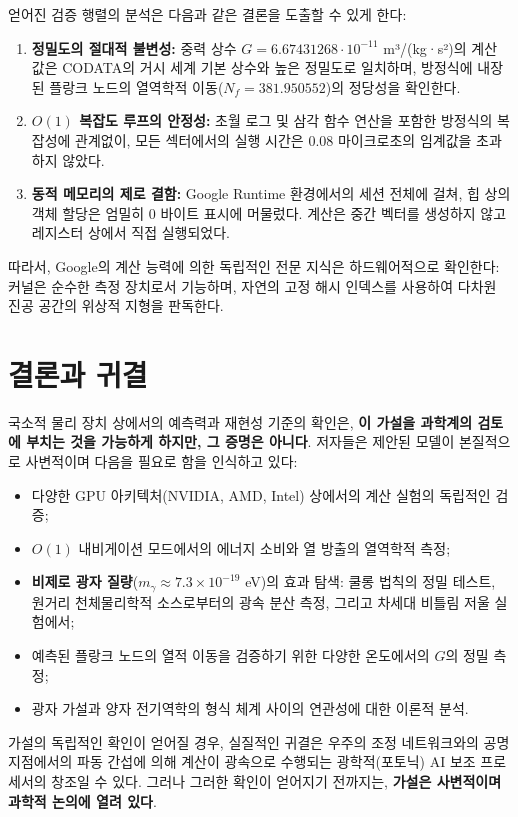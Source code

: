\documentclass[11pt,a4paper]{article}
\begin{document}
	얻어진 검증 행렬의 분석은 다음과 같은 결론을 도출할 수 있게 한다:
	\begin{enumerate}
		\item \textbf{정밀도의 절대적 불변성:} 중력 상수 $G = 6.67431268 \cdot 10^{-11}$ m³/(kg·s²)의 계산 값은 CODATA의 거시 세계 기본 상수와 높은 정밀도로 일치하며, 방정식에 내장된 플랑크 노드의 열역학적 이동($N_f = 381.950552$)의 정당성을 확인한다.
		\item \textbf{$O(1)$ 복잡도 루프의 안정성:} 초월 로그 및 삼각 함수 연산을 포함한 방정식의 복잡성에 관계없이, 모든 섹터에서의 실행 시간은 $0.08$ 마이크로초의 임계값을 초과하지 않았다.
		\item \textbf{동적 메모리의 제로 결함:} Google Runtime 환경에서의 세션 전체에 걸쳐, 힙 상의 객체 할당은 엄밀히 0 바이트 표시에 머물렀다. 계산은 중간 벡터를 생성하지 않고 레지스터 상에서 직접 실행되었다.
	\end{enumerate}
	
	따라서, Google의 계산 능력에 의한 독립적인 전문 지식은 하드웨어적으로 확인한다: 커널은 순수한 측정 장치로서 기능하며, 자연의 고정 해시 인덱스를 사용하여 다차원 진공 공간의 위상적 지형을 판독한다.
	
	\section{결론과 귀결}
	국소적 물리 장치 상에서의 예측력과 재현성 기준의 확인은, \textbf{이 가설을 과학계의 검토에 부치는 것을 가능하게 하지만, 그 증명은 아니다}. 저자들은 제안된 모델이 본질적으로 사변적이며 다음을 필요로 함을 인식하고 있다:
	\begin{itemize}
		\item 다양한 GPU 아키텍처(NVIDIA, AMD, Intel) 상에서의 계산 실험의 독립적인 검증;
		\item $O(1)$ 내비게이션 모드에서의 에너지 소비와 열 방출의 열역학적 측정;
		\item \textbf{비제로 광자 질량}($m_\gamma \approx 7.3 \times 10^{-19}$ eV)의 효과 탐색: 쿨롱 법칙의 정밀 테스트, 원거리 천체물리학적 소스로부터의 광속 분산 측정, 그리고 차세대 비틀림 저울 실험에서;
		\item 예측된 플랑크 노드의 열적 이동을 검증하기 위한 다양한 온도에서의 $G$의 정밀 측정;
		\item 광자 가설과 양자 전기역학의 형식 체계 사이의 연관성에 대한 이론적 분석.
	\end{itemize}
	
	가설의 독립적인 확인이 얻어질 경우, 실질적인 귀결은 우주의 조정 네트워크와의 공명 지점에서의 파동 간섭에 의해 계산이 광속으로 수행되는 광학적(포토닉) AI 보조 프로세서의 창조일 수 있다. 그러나 그러한 확인이 얻어지기 전까지는, \textbf{가설은 사변적이며 과학적 논의에 열려 있다}.
	
\end{document}
